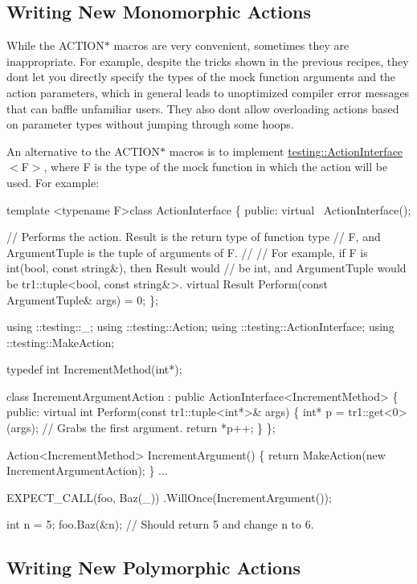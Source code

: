 \subsection*{Writing New Monomorphic Actions}

While the {\ttfamily A\+C\+T\+I\+O\+N$\ast$} macros are very convenient, sometimes they are inappropriate. For example, despite the tricks shown in the previous recipes, they don\textquotesingle{}t let you directly specify the types of the mock function arguments and the action parameters, which in general leads to unoptimized compiler error messages that can baffle unfamiliar users. They also don\textquotesingle{}t allow overloading actions based on parameter types without jumping through some hoops.

An alternative to the {\ttfamily A\+C\+T\+I\+O\+N$\ast$} macros is to implement {\ttfamily \hyperlink{classtesting_1_1ActionInterface}{testing\+::\+Action\+Interface}$<$F$>$}, where {\ttfamily F} is the type of the mock function in which the action will be used. For example\+:


\begin{DoxyCode}
template <typename F>class ActionInterface \{
 public:
  virtual ~ActionInterface();

  // Performs the action.  Result is the return type of function type
  // F, and ArgumentTuple is the tuple of arguments of F.
  //
  // For example, if F is int(bool, const string&), then Result would
  // be int, and ArgumentTuple would be tr1::tuple<bool, const string&>.
  virtual Result Perform(const ArgumentTuple& args) = 0;
\};

using ::testing::\_;
using ::testing::Action;
using ::testing::ActionInterface;
using ::testing::MakeAction;

typedef int IncrementMethod(int*);

class IncrementArgumentAction : public ActionInterface<IncrementMethod> \{
 public:
  virtual int Perform(const tr1::tuple<int*>& args) \{
    int* p = tr1::get<0>(args);  // Grabs the first argument.
    return *p++;
  \}
\};

Action<IncrementMethod> IncrementArgument() \{
  return MakeAction(new IncrementArgumentAction);
\}
...

  EXPECT\_CALL(foo, Baz(\_))
      .WillOnce(IncrementArgument());

  int n = 5;
  foo.Baz(&n);  // Should return 5 and change n to 6.
\end{DoxyCode}


\subsection*{Writing New Polymorphic Actions}

